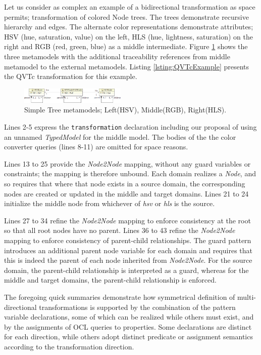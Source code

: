 Let us consider as complex an example of a bidirectional transformation as space permits; transformation of colored Node trees. The trees demonstrate recursive hierarchy and edges. The alternate color representations demonstrate attributes; HSV (hue, saturation, value) on the left, HLS (hue, lightness, saturation) on the right and RGB (red, green, blue) as a middle intermediate. Figure \ref{fig:TreeMM} shows the three metamodels with the additional traceability references from middle metamodel to the external metamodels.  Listing \ref{lsting:QVTcExample} presents the QVTc transformation for this example.

\begin{figure}[hb]
	\centering
	\includegraphics[width=0.45\textwidth]{Metamodels.png}
	\caption{Simple Tree metamodels; Left(HSV), Middle(RGB), Right(HLS).}
	\label{fig:TreeMM}
\end{figure}



Lines 2-5 express the \texttt{transform\-ation} declaration including our proposal of using an unnamed \textit{TypedModel} for the middle model. The bodies of the the color converter queries (lines 8-11) are omitted for space reasons.

Lines 13 to 25 provide the \textit{Node2Node} mapping, without any guard variables or constraints; the mapping is therefore unbound. Each domain realizes a \textit{Node}, and so requires that where that node exists in a source domain, the corresponding nodes are created or updated in the middle and target domains. Lines 21 to 24 initialize the middle node from whichever of \textit{hsv} or \textit{hls} is the source.

Lines 27 to 34 refine the \textit{Node2Node} mapping to enforce consistency at the root so that all root nodes have no parent. Lines 36 to 43 refine the \textit{Node2Node} mapping to enforce consistency of parent-child relationships. The guard pattern introduces an additional parent node variable for each domain and requires that this is indeed the parent of each node inherited from \textit{Node2Node}. For the source domain, the parent-child relationship is interpreted as a guard, whereas for the middle and target domains, the parent-child relationship is enforced.

The foregoing quick summaries demonstrate how symmetrical definition of multi-directional transformations is supported by the combination of the pattern variable declarations, some of which can be realized while others must exist, and by the assignments of OCL queries to properties. Some declarations are distinct for each direction, while others adopt distinct predicate or assignment semantics according to the transformation direction.

